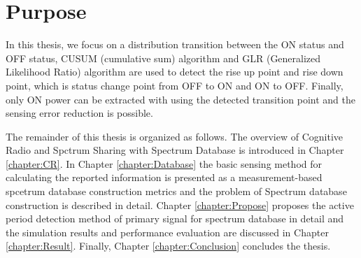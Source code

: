 \section{Purpose}
In this thesis, we focus on a distribution transition between the ON status and OFF status, CUSUM (cumulative sum) algorithm \cite{ref:CUSUM} and GLR (Generalized Likelihood Ratio) algorithm \cite{ref:GLR} are used to detect the rise up point and rise down point, which is status change point from OFF to ON and ON to OFF. Finally, only ON power can be extracted with using the detected transition point and the sensing error reduction is possible. 

The remainder of this thesis is organized as follows. The overview of Cognitive Radio and Spctrum Sharing with Spectrum Database is introduced in Chapter \ref{chapter:CR}. In Chapter \ref{chapter:Database} the basic sensing method for calculating the reported information is presented as a measurement-based spcetrum database construction metrics and the problem of Spectrum database construction is described in detail. Chapter \ref{chapter:Propose} proposes the active period detection method of primary signal for spectrum database in detail and the simulation results and performance evaluation are discussed in Chapter \ref{chapter:Result}. Finally, Chapter \ref{chapter:Conclusion} concludes the thesis.
